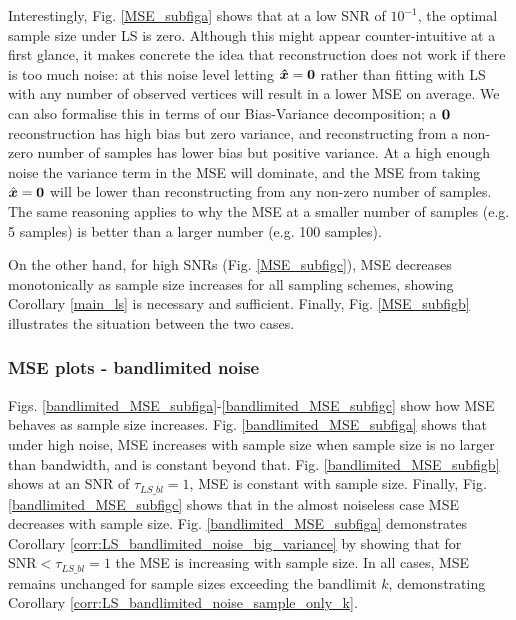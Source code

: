 Interestingly, Fig. \ref{MSE_subfiga} shows that at a low SNR of $10^{-1}$, the optimal sample size under LS is zero. Although this might appear counter-intuitive at a first glance, it makes concrete the idea that reconstruction does not work if there is too much noise: at this noise level letting $\bm{\hat{x}} = \bm{0}$ rather than fitting with LS with any number of observed vertices will result in a lower MSE on average. We can also formalise this in terms of our Bias-Variance decomposition; a $\bm{0}$ reconstruction has high bias but zero variance, and reconstructing from a non-zero number of samples has lower bias but positive variance. At a high enough noise the variance term in the MSE will dominate, and the MSE from taking $\hat{\bm{x}} = \bm{0}$ will be lower than reconstructing from any non-zero number of samples. The same reasoning applies to why the MSE at a smaller number of samples (e.g. 5 samples) is better than a larger number (e.g. 100 samples).


On the other hand, for high SNRs (Fig. \ref{MSE_subfigc}), MSE decreases monotonically as sample size increases for all sampling schemes, showing Corollary \ref{main_ls} is necessary and sufficient. %
Finally, Fig. \ref{MSE_subfigb} illustrates the situation between the two cases.



\subsubsection{MSE plots - bandlimited noise}
Figs. \ref{bandlimited_MSE_subfiga}-\ref{bandlimited_MSE_subfigc} show how MSE behaves as sample size increases. Fig. \ref{bandlimited_MSE_subfiga} shows that under high noise, MSE increases with sample size when sample size is no larger than bandwidth, and is constant beyond that. Fig. \ref{bandlimited_MSE_subfigb} shows at an SNR of $\tau_{LS\_bl} = 1$, MSE is constant with sample size. Finally, Fig. \ref{bandlimited_MSE_subfigc} shows that in the almost noiseless case MSE decreases with sample size. Fig. \ref{bandlimited_MSE_subfiga} demonstrates Corollary \ref{corr:LS_bandlimited_noise_big_variance} by showing that for $\textrm{SNR} < \tau_{LS\_bl}=1$ the MSE is increasing with sample size. In all cases, MSE remains unchanged for sample sizes exceeding the bandlimit $k$, demonstrating Corollary \ref{corr:LS_bandlimited_noise_sample_only_k}.
